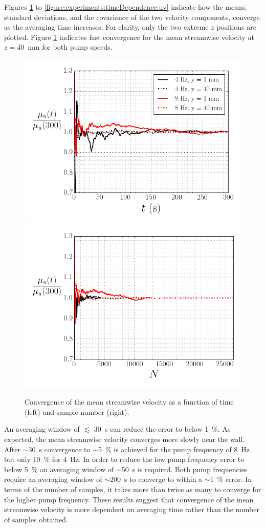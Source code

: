 \documentclass[12pt,oneside,a4paper]{article}
\begin{document}
Figures \ref{figure:experiments:timeDependence:meanUx} to \ref{figure:experiments:timeDependence:uv} indicate how the means, standard deviations, and the covariance of the two velocity components, converge as the averaging time increases. For clarity, only the two extreme $z$ positions are plotted. Figure  \ref{figure:experiments:timeDependence:meanUx} indicates fast convergence for the mean streamwise velocity at $z=$\SI{40}{mm} for both pump speeds.
%
\begin{figure}[!h]
\centering
\includegraphics[width=0.5\linewidth]{images/LDA_timeDependenceImages/UxMeanTConvergence.png}\hfill
\includegraphics[width=0.5\linewidth]{images/LDA_timeDependenceImages/UxMeanNConvergence.png}\\
\caption{Convergence of the mean streamwise velocity as a function of time (left) and sample number (right).}
\label{figure:experiments:timeDependence:meanUx}
\end{figure}
%
 An averaging window of $\lesssim$ \SI{30}{s} can reduce the error to below \SI{1}{\%}. As expected, the mean streamwise velocity converges more slowly near the wall. After $\sim$\SI{30}{s} convergence to $\sim$\SI{5}{\%} is achieved for the pump frequency of \SI{8}{Hz} but only \SI{10}{\%} for \SI{4}{Hz}. In order to reduce the low pump frequency error to below \SI{5}{\%} an averaging window of $\sim$\SI{50}{s} is required. Both pump frequencies require an averaging window of $\sim$\SI{200}{s} to converge to within a $\sim$\SI{1}{\%} error. In terms of the number of samples, it takes more than twice as many to converge for the higher pump frequency. These results suggest that convergence of the mean streamwise velocity is more dependent on averaging time rather than the number of samples obtained. 
 
\end{document}
